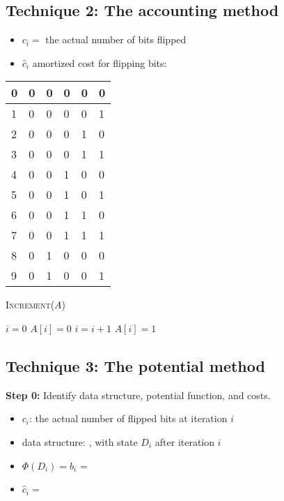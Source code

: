 \documentclass[11  pt]{article}
\begin{document}
\pagebreak
\subsection{Technique 2: The accounting method}
\begin{itemize}
\item $c_i = $ the actual number of bits flipped
\item $\hat{c}_i$ amortized cost for flipping bits: 
\end{itemize}
{\Huge
\begin{tabular}{ l || p{1cm} | p{1cm} | p{1cm} | p{1cm} | p{1cm} |}
\hline
0& 	0 & 0 & 0 & 0 & 0\\
\hline 
1& 	0 & 0 & 0 & 0 & 1\\
\hline 
2& 	0 & 0 & 0 & 1 & 0\\
\hline 
3& 	0 & 0 & 0 & 1 & 1\\
\hline 
4& 	0 & 0 & 1 & 0 & 0\\
\hline 
5& 	0 & 0 & 1 & 0 & 1\\
\hline 
6& 	0 & 0 & 1 & 1 & 0\\
\hline 
7& 	0 & 0 & 1 & 1 & 1\\
\hline 
8& 	0 & 1 & 0 & 0 & 0\\
\hline 
9& 	0 & 1 & 0 & 0 & 1\\
\hline 
\end{tabular}
}
\begin{algorithm}
\textsc{Increment}($A$)
\begin{algorithmic}
\State $i = 0$
\State $A[i] = 0$
\State $i = i+1$
\EndWhile
{}
\State $A[i] = 1$
\EndIf
\end{algorithmic}
\end{algorithm}

\pagebreak
\subsection{Technique 3: The potential method}

\textbf{Step 0:} Identify data structure, potential function, and costs.
\begin{itemize}
\item $c_i$: the actual number of flipped bits at iteration $i$
\item data structure: , with state $D_i$ after iteration $i$
\item $\Phi(D_i) = b_i$ =  %
\item $\hat{c}_i = $ 
\end{itemize}
\end{document}
